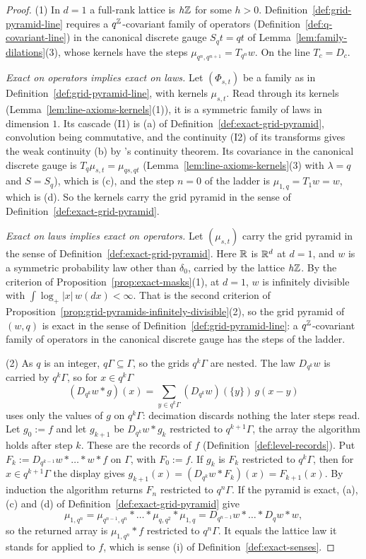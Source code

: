 \begin{proof}
(1) In $d = 1$ a full-rank lattice is $h\mathbb{Z}$ for some $h > 0$. Definition~\ref{def:grid-pyramid-line}
requires a $q^{\mathbb{Z}}$-covariant family of operators (Definition~\ref{def:q-covariant-line}) in the
canonical discrete gauge $S_qt = qt$ of Lemma~\ref{lem:family-dilations}(3), whose kernels have the
steps $\mu_{q^n,q^{n+1}} = T_{q^n}w$. On the line $T_c = D_c$.

\emph{Exact on operators implies exact on laws.} Let $(\Phi_{s,t})$ be a family as in
Definition~\ref{def:grid-pyramid-line}, with kernels $\mu_{s,t}$. Read through its kernels
(Lemma~\ref{lem:line-axioms-kernels}(1)), it is a symmetric family of laws in dimension $1$. Its
cascade (I1) is (a) of Definition~\ref{def:exact-grid-pyramid}, convolution being commutative, and
the continuity (I2) of its transforms gives the weak continuity (b) by \Levy's continuity theorem.
Its covariance in the canonical discrete gauge is $T_q\mu_{s,t} = \mu_{qs,qt}$
(Lemma~\ref{lem:line-axioms-kernels}(3) with $\lambda = q$ and $S = S_q$), which is (c), and the
step $n = 0$ of the ladder is $\mu_{1,q} = T_1w = w$, which is (d). So the kernels carry the grid
pyramid in the sense of Definition~\ref{def:exact-grid-pyramid}.

\emph{Exact on laws implies exact on operators.} Let $(\mu_{s,t})$ carry the grid pyramid in the
sense of Definition~\ref{def:exact-grid-pyramid}. Here $\mathbb{R}$ is $\mathbb{R}^d$ at $d = 1$, and $w$ is a
symmetric probability law other than $\delta_0$, carried by the lattice $h\mathbb{Z}$. By the criterion
of Proposition~\ref{prop:exact-masks}(1), at $d = 1$, $w$ is infinitely divisible with
$\int\log_+|x|\,w(dx) < \infty$. That is the second criterion of
Proposition~\ref{prop:grid-pyramids-infinitely-divisible}(2), so the grid pyramid of $(w, q)$ is
exact in the sense of Definition~\ref{def:grid-pyramid-line}: a $q^{\mathbb{Z}}$-covariant family of
operators in the canonical discrete gauge has the steps of the ladder.

(2) As $q$ is an integer, $q\Gamma \subseteq \Gamma$, so the grids $q^k\Gamma$ are nested. The law
$D_{q^k}w$ is carried by $q^k\Gamma$, so for $x \in q^k\Gamma$
\[
(D_{q^k}w * g)(x) = \sum_{y \in q^k\Gamma}(D_{q^k}w)(\{y\})\,g(x - y)
\]
uses only the values of $g$ on $q^k\Gamma$: decimation discards nothing the later steps read. Let
$g_0 := f$ and let $g_{k+1}$ be $D_{q^k}w * g_k$ restricted to $q^{k+1}\Gamma$, the array the
algorithm holds after step $k$. These are the records of $f$ (Definition~\ref{def:level-records}). Put $F_k := D_{q^{k-1}}w * \dots * w * f$ on $\Gamma$, with
$F_0 := f$. If $g_k$ is $F_k$ restricted to $q^k\Gamma$, then for $x \in q^{k+1}\Gamma$ the display
gives $g_{k+1}(x) = (D_{q^k}w * F_k)(x) = F_{k+1}(x)$. By induction the algorithm returns $F_n$
restricted to $q^n\Gamma$. If the pyramid is exact, (a), (c) and (d) of
Definition~\ref{def:exact-grid-pyramid} give
\[
\mu_{1,q^n} = \mu_{q^{n-1},q^n} * \dots * \mu_{q,q^2} * \mu_{1,q} = D_{q^{n-1}}w * \dots * D_qw * w,
\]
so the returned array is $\mu_{1,q^n} * f$ restricted to $q^n\Gamma$. It equals the lattice law it
stands for applied to $f$, which is sense (i) of Definition~\ref{def:exact-senses}.
\end{proof}


